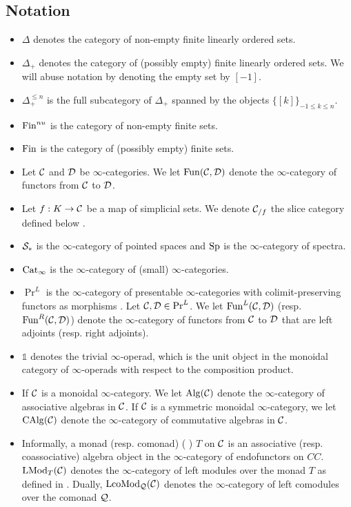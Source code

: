 \subsection{Notation}
\begin{itemize}
	\item $\Delta$ denotes the category of non-empty finite linearly ordered sets.
	\item $\Delta_{+}$ denotes the category of (possibly empty) finite linearly ordered sets. We will abuse notation by denoting the empty set by $[-1]$.
	\item $\Delta^{\leq n}_{+}$ is the full subcategory of $\Delta_{+}$ spanned by the objects $\{[k]\}_{-1\leq k\leq n}$.
	\item $\operatorname{Fin}^{nu}$ is the category of non-empty finite sets.
	\item $\operatorname{Fin}$ is the category of (possibly empty) finite sets. 
	\item Let ${\mathcal{C}}$ and ${\mathcal{D}}$ be $\infty$-categories. We let $\operatorname{Fun}({\mathcal{C}},{\mathcal{D}})$ denote the $\infty$-category of functors from ${\mathcal{C}}$ to ${\mathcal{D}}$.
	\item Let $f:K \to {\mathcal{C}}$ be a map of simplicial sets.
	We denote ${\mathcal{C}}_{/f}$ the slice category defined below \cite[Proposition 1.2.9.2.]{HTT}.
	\item ${\mathcal{S}}_{*}$ is the $\infty$-category of pointed spaces and $\operatorname{Sp}$ is the $\infty$-category of spectra.
	\item $\operatorname{Cat}_{\infty}$ is the $\infty$-category of (small) $\infty$-categories.
	\item $\Pr^{L}$ is the $\infty$-category of presentable $\infty$-categories with colimit-preserving functors as morphisms \cite[Definition 5.5.3.1.]{HTT}.
	Let ${\mathcal{C}},{\mathcal{D}} \in \Pr^L$. We let $\operatorname{Fun}^L({\mathcal{C}},{\mathcal{D}})$ (resp. $\operatorname{Fun}^{R}({\mathcal{C}}, {\mathcal{D}})$) denote  the $\infty$-category of functors from ${\mathcal{C}}$ to ${\mathcal{D}}$ that are left adjoints (resp. right adjoints).
	\item $\mathds{1}$ denotes the trivial $\infty$-operad, which is the unit object in the monoidal category of $\infty$-operads with respect to the composition product.
	\item If ${\mathcal{C}}$ is a monoidal $\infty$-category. We let $\operatorname{Alg}({\mathcal{C}})$ denote the $\infty$-category of associative algebras in ${\mathcal{C}}$.
	If ${\mathcal{C}}$ is a symmetric monoidal $\infty$-category, we let $\operatorname{CAlg}({\mathcal{C}})$ denote the 
	$\infty$-category of commutative algebras in ${\mathcal{C}}$.
	\item 
	Informally, a monad (resp. comonad) ( \cite[Definition 4.7.3.2.]{HA}) $T$ on ${\mathcal{C}}$ is an associative (resp. coassociative) algebra object in the $\infty$-category of endofunctors on $CC$. 
	$\operatorname{LMod}_{T}({\mathcal{C}})$ denotes the $\infty$-category of left modules over the monad $T$ as defined in \cite[Section 4.2]{HA}. Dually, $\operatorname{LcoMod}_{{\mathcal{Q}}}({\mathcal{C}})$ denotes the $\infty$-category of left comodules over the comonad ${\mathcal{Q}}$.
\end{itemize}